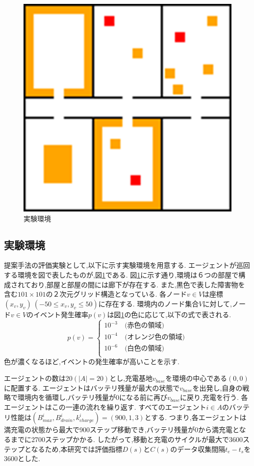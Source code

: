 \documentclass[12pt,a4j,twoside]{jarticle}
\begin{document}
  \begin{figure}
    \centering
    \includegraphics[width=0.6\hsize]{figures/Graph_Office.png}
    \caption{実験環境}
    \label{fig:env}
  \end{figure}

  \subsection{実験環境}
  提案手法の評価実験として,以下に示す実験環境を用意する.
  エージェントが巡回する環境を図で表したものが,図\ref{fig:env}である.
  図\ref{fig:env}に示す通り,環境は６つの部屋で構成されており,部屋と部屋の間には廊下が存在する.
  また,黒色で表した障害物を含む$101 \times 101$の２次元グリッド構造となっている.
  各ノード$v \in V$は座標$(x_v, y_v)~(-50 \leq x_v,y_v \leq 50)$に存在する.
  環境内のノード集合$V$に対して,ノード$v \in V$のイベント発生確率$p(v)$は図\ref{fig:env}の色に応じて,以下の式で表される.
  \begin{equation}
    p(v) = 
    \begin{cases}
      10^{-3}\ & \textrm{(赤色の領域)}\\
      10^{-4}\ & \textrm{(オレンジ色の領域)}\\
      10^{-6}\ & \textrm{(白色の領域)}\\
    \end{cases}
    \label{eq:prob}
  \end{equation}
  色が濃くなるほど,イベントの発生確率が高いことを示す.

  \par
  エージェントの数は20$(|A| = 20)$とし,充電基地$v_{base}$を環境の中心である$(0, 0)$に配置する.
  エージェントはバッテリ残量が最大の状態で$v_{base}$を出発し,自身の戦略で環境内を循環し,バッテリ残量が0になる前に再び$v_{base}$に戻り,充電を行う.
  各エージェントはこの一連の流れを繰り返す.
  すべてのエージェント$i \in A$のバッテリ性能は$(B^i_{max}, B^i_{drain}, k^i_{charge}) = (900, 1, 3)$とする.
  つまり,各エージェントは満充電の状態から最大で900ステップ移動でき,バッテリ残量が0から満充電となるまでに2700ステップかかる.
  したがって,移動と充電のサイクルが最大で3600ステップとなるため,本研究では評価指標$D(s)$と$C(s)$のデータ収集間隔$t_e-t_s$を3600とした.
\end{document}
